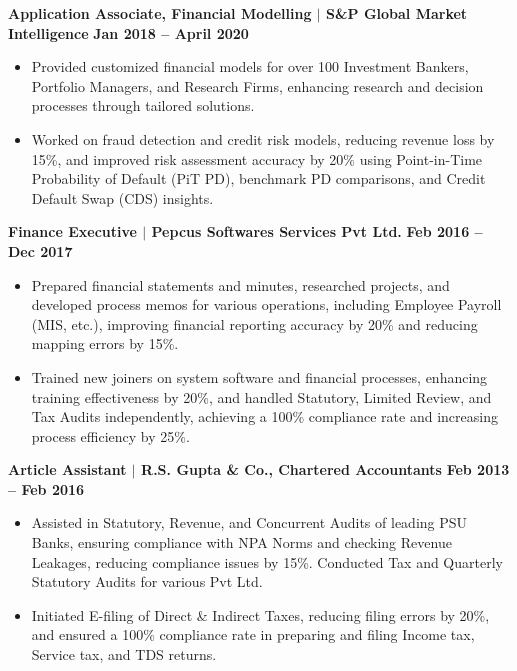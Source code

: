 \documentclass{article}
\begin{document}
\vspace{1mm}
\noindent \textbf{Application Associate, Financial Modelling $\mid$ S\&P Global Market Intelligence} \hfill \textbf{Jan 2018 – April 2020}
\begin{itemize}[noitemsep,nolistsep,leftmargin=*]
    \item {\small Provided customized financial models for over 100 Investment Bankers, Portfolio Managers, and Research Firms, enhancing research and decision processes through tailored solutions.}
    \item {\small Worked on fraud detection and credit risk models, reducing revenue loss by 15\%, and improved risk assessment accuracy by 20\% using Point-in-Time Probability of Default (PiT PD), benchmark PD comparisons, and Credit Default Swap (CDS) insights.}
\end{itemize}
\vspace{1mm}
\noindent \textbf{Finance Executive $\mid$ Pepcus Softwares Services Pvt Ltd.} \hfill \textbf{Feb 2016 – Dec 2017}
\begin{itemize}[noitemsep,nolistsep,leftmargin=*]
\item {\small Prepared financial statements and minutes, researched projects, and developed process memos for various operations, including Employee Payroll (MIS, etc.), improving financial reporting accuracy by 20\% and reducing mapping errors by 15\%.}
\item {\small Trained new joiners on system software and financial processes, enhancing training effectiveness by 20\%, and handled Statutory, Limited Review, and Tax Audits independently, achieving a 100\% compliance rate and increasing process efficiency by 25\%.}
\end{itemize}
\vspace{1mm}
\noindent \textbf{Article Assistant $\mid$ R.S. Gupta \& Co., Chartered Accountants} \hfill \textbf{Feb 2013 – Feb 2016}
\begin{itemize}[noitemsep,nolistsep,leftmargin=*]
   \item {\small Assisted in Statutory, Revenue, and Concurrent Audits of leading PSU Banks, ensuring compliance with NPA Norms and checking Revenue Leakages, reducing compliance issues by 15\%. Conducted Tax and Quarterly Statutory Audits for various Pvt Ltd.}
    \item {\small Initiated E-filing of Direct \& Indirect Taxes, reducing filing errors by 20\%, and ensured a 100\% compliance rate in preparing and filing Income tax, Service tax, and TDS returns.}
\end{itemize}
\end{document}
